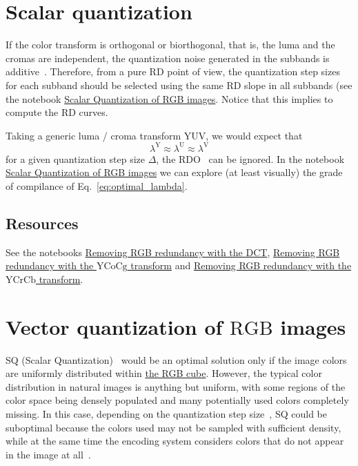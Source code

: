 \section{Scalar quantization}

If the color transform is orthogonal or biorthogonal, that is, the luma
and the cromas are independent, the quantization noise generated in
the subbands is additive~\cite{burger2016digital}. Therefore, from a
pure RD point of view, the quantization step sizes for each subband
should be selected using the same RD slope in all subbands (see
the notebook
\href{https://github.com/vicente-gonzalez-ruiz/color_transforms/blob/main/docs/RGB/RGB_SQ.ipynb}{Scalar
  Quantization of RGB images}. Notice that this implies to compute the
RD curves.

Taking a generic luma / croma transform $\text{YUV}$, we would expect that
\begin{equation}
  \lambda^{\text{Y}} \approx \lambda^{\text{U}} \approx \lambda^{\text{V}}
  \label{eq:optimal_lambda}
\end{equation}
for a given quantization step size $\Delta$, the
RDO~\cite{vruiz__information_theory} can be ignored. In the notebook
\href{https://github.com/Sistemas-Multimedia/Sistemas-Multimedia.github.io/blob/master/contents/RGB_SQ/RGB_SQ.ipynb}{Scalar
  Quantization of RGB images} we can explore (at least visually) the
grade of compilance of Eq.~\eqref{eq:optimal_lambda}.

\subsection*{Resources}
See the notebooks
\href{https://github.com/vicente-gonzalez-ruiz/color_transforms/blob/main/docs/3DCT/3DCT_over_RGB.ipynb}{Removing
  RGB redundancy with the DCT},
\href{https://github.com/vicente-gonzalez-ruiz/color_transforms/blob/main/docs/YCoCg/YCoCg_over_RGB.ipynb}{Removing
  RGB redundancy with the $\text{YCoCg}$ transform} and
\href{https://github.com/vicente-gonzalez-ruiz/color_transforms/blob/main/docs/YCrCb/YCrCb_over_RGB.ipynb}{Removing
  RGB redundancy with the $\text{YCrCb}$ transform}.

\section{Vector quantization of $\text{RGB}$ images}

SQ (Scalar
Quantization)~\cite{vruiz__scalar_quantization,sayood2017introduction}
would be an optimal solution only if the image colors are uniformly
distributed within
\href{https://en.wikipedia.org/wiki/RGB_color_model}{the RGB
  cube}. However, the typical color distribution in natural images is
anything but uniform, with some regions of the color space being
densely populated and many potentially used colors completely
missing. In this case, depending on the quantization step
size~\cite{vruiz__signal_quantization}, SQ could be suboptimal because
the colors used may not be sampled with sufficient density, while at the
same time the encoding system considers colors that do not appear
in the image at all~\cite{burger2016digital}.


